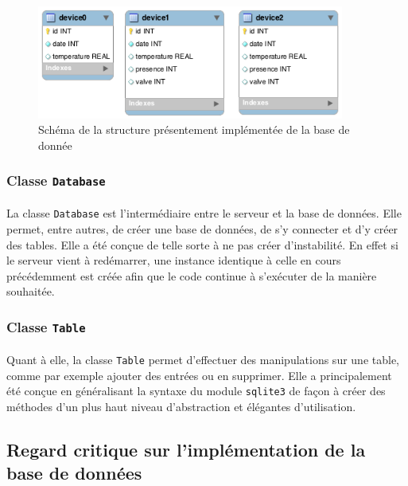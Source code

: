 \documentclass[11pt,a4paper,11pt]{report}
\begin{document}
\begin{figure}
\centering
\includegraphics[width=0.9\textwidth]{images/current_structure.png}
\caption{Schéma de la structure présentement implémentée de la base de donnée}
\label{current_structure}
\end{figure}

\subsubsection{Classe \texttt{Database} }
\paragraph*{}
   La classe \texttt{Database} est l'intermédiaire entre le serveur et la base de données. Elle permet, entre autres, de créer une base de données, de s'y connecter et d'y créer des tables. Elle a été conçue de telle sorte à ne pas créer d'instabilité. En effet si le serveur vient à redémarrer, une instance identique à celle en cours précédemment est créée afin que le code continue à s'exécuter de la manière souhaitée.
    
\subsubsection{Classe \texttt{Table}}
\paragraph*{}
	Quant à elle, la classe \texttt{Table} permet d'effectuer des manipulations sur une table, comme par exemple ajouter des entrées ou en supprimer. Elle a principalement été conçue en généralisant la syntaxe du module \texttt{sqlite3} de façon à créer des méthodes d'un plus haut niveau d'abstraction et élégantes d'utilisation.
    
\subsection{Regard critique sur l'implémentation de la base de données}
\end{document}
